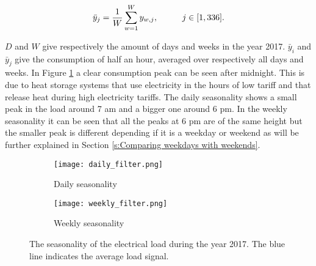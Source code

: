 \begin{equation}\label{eq:weekly_filter}
	\bar{y}_j = \frac{1}{W} \sum_{w=1}^W y_{w,j}, \hspace{10mm}  j \in [1,336].
\end{equation} 

 $ D $ and $ W $ give respectively the amount of days and weeks in the year 2017. $\bar{y}_i$ and $\bar{y}_j$ give the consumption of half an hour, averaged over respectively all days and weeks. In Figure \ref{fig:average_signals} a clear consumption peak can be seen after midnight. This is due to heat storage systems that use electricity in the hours of low tariff and that release heat during high electricity tariffs. The daily seasonality shows a small peak in the load around 7 am and a bigger one around 6 pm. In the weekly seasonality it can be seen that all the peaks at 6 pm are of the same height but the smaller peak is different depending if it is a weekday or weekend as will be further explained in Section \ref{s:Comparing weekdays with weekends}. 

\begin{figure}[h!]
	\begin{subfigure}{1.0\textwidth}
		\centering
		\texttt{[image: daily\_filter.png]}
		\caption{Daily seasonality}
	\end{subfigure}	 	
	\begin{subfigure}{1.0\textwidth}
		\centering
		\texttt{[image: weekly\_filter.png]}
		\caption{Weekly seasonality}
	\end{subfigure}	
	\caption{The seasonality of the electrical load during the year 2017. The blue line indicates the average load signal. }
	\label{fig:average_signals}
\end{figure}





